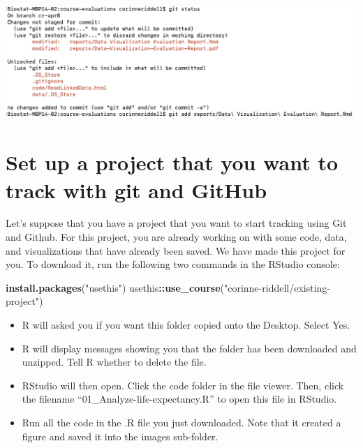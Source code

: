 \documentclass[
]{book}
\newenvironment{Shaded}{\begin{snugshade}}{\end{snugshade}}
\newcommand{\FunctionTok}[1]{\textcolor[rgb]{0.13,0.29,0.53}{\textbf{#1}}}
\newcommand{\NormalTok}[1]{#1}
\newcommand{\SpecialCharTok}[1]{\textcolor[rgb]{0.81,0.36,0.00}{\textbf{#1}}}
\newcommand{\StringTok}[1]{\textcolor[rgb]{0.31,0.60,0.02}{#1}}
\providecommand{\tightlist}{%
  \setlength{\itemsep}{0pt}\setlength{\parskip}{0pt}}
\begin{document}
\includegraphics[width=1\linewidth]{./figures/Space-in-pathways-pain}

\hypertarget{set-up-a-project-that-you-want-to-track-with-git-and-github}{%
\section{Set up a project that you want to track with git and GitHub}\label{set-up-a-project-that-you-want-to-track-with-git-and-github}}

Let's suppose that you have a project that you want to start tracking using Git
and Github. For this project, you are already working on with some code, data,
and visualizations that have already been saved. We have made this project for
you. To download it, run the following two commands in the RStudio console:

\begin{Shaded}
\begin{Highlighting}[]
\FunctionTok{install.packages}\NormalTok{(}\StringTok{"usethis"}\NormalTok{)}
\NormalTok{usethis}\SpecialCharTok{::}\FunctionTok{use\_course}\NormalTok{(}\StringTok{"corinne{-}riddell/existing{-}project"}\NormalTok{)}
\end{Highlighting}
\end{Shaded}

\begin{itemize}
\tightlist
\item
  R will asked you if you want this folder copied onto the Desktop. Select Yes.
\item
  R will display messages showing you that the folder has been downloaded and unzipped.
  Tell R whether to delete the file.
\item
  RStudio will then open. Click the code folder in the file viewer. Then, click
  the filename ``01\_Analyze-life-expectancy.R'' to open this file in RStudio.
\item
  Run all the code in the .R file you just downloaded. Note that it created a figure and
  saved it into the images sub-folder.
\end{itemize}
\end{document}
